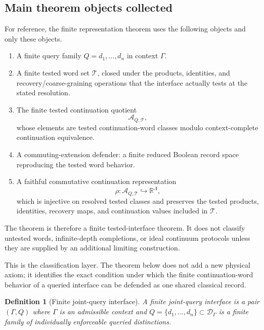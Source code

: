 \documentclass[11pt]{article}
\newtheorem{definition}[theorem]{Definition}
\begin{document}
\subsection{Main theorem objects collected}\label{subsec:main-theorem-objects}
For reference, the finite representation theorem uses the following objects and only these objects.
\begin{enumerate}[label=(\roman*),leftmargin=2em]
\item A finite query family $Q={d_1,\ldots,d_n}$ in context $\Gamma$.
\item A finite tested word set $\mathcal T$, closed under the products, identities, and recovery/coarse-graining operations that the interface actually tests at the stated resolution.
\item The finite tested continuation quotient
\[
  \mathcal A_{Q,\mathcal T},
\]
whose elements are tested continuation-word classes modulo context-complete continuation equivalence.
\item A commuting-extension defender: a finite reduced Boolean record space reproducing the tested word behavior.
\item A faithful commutative continuation representation
\[
 \rho:\mathcal A_{Q,\mathcal T}\hookrightarrow\mathbb R^\Lambda,
\]
which is injective on resolved tested classes and preserves the tested products, identities, recovery maps, and continuation values included in $\mathcal T$.
\end{enumerate}
The theorem is therefore a finite tested-interface theorem.  It does not classify untested words, infinite-depth completions, or ideal continuum protocols unless they are supplied by an additional limiting construction.

This is the classification layer.  The theorem below does not add a new physical axiom; it identifies the exact condition under which the finite continuation-word behavior of a queried interface can be defended as one shared classical record.

\begin{definition}[Finite joint-query interface]
A finite joint-query interface is a pair $(\Gamma,Q)$ where $\Gamma$ is an admissible context and $Q=\{d_1,\ldots,d_n\}\subset\mathcal D_\Gamma$ is a finite family of individually enforceable queried distinctions.
\end{definition}
\end{document}
